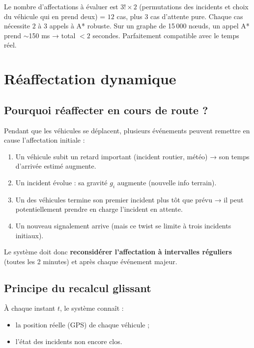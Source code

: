 \documentclass[12pt,a4paper]{article}
\theoremstyle{definition}
\theoremstyle{remark}
\begin{document}
Le nombre d’affectations à évaluer est $3! \times 2$ (permutations des
incidents et choix du véhicule qui en prend deux) = $12$ cas, plus
$3$ cas d’attente pure. Chaque cas nécessite $2$ à $3$ appels à A*
robuste. Sur un graphe de 15\,000 nœuds, un appel A* prend $\sim$150 ms
→ total $< 2$ secondes. Parfaitement compatible avec le temps réel.

\newpage

\section{Réaffectation dynamique}
\label{sec:dyn_realloc}

\subsection{Pourquoi réaffecter en cours de route ?}

Pendant que les véhicules se déplacent, plusieurs événements peuvent
remettre en cause l’affectation initiale :

\begin{enumerate}[leftmargin=1.5em]
  \item Un véhicule subit un retard important (incident routier, météo)
        → son temps d’arrivée estimé augmente.
  \item Un incident évolue : sa gravité $g_i$ augmente (nouvelle info
        terrain).
  \item Un des véhicules termine son premier incident plus tôt que prévu
        → il peut potentiellement prendre en charge l’incident en attente.
  \item Un nouveau signalement arrive (mais ce twist se limite à trois
        incidents initiaux).
\end{enumerate}

Le système doit donc \textbf{reconsidérer l’affectation à intervalles
réguliers} (toutes les 2 minutes) et après chaque événement majeur.

\subsection{Principe du recalcul glissant}

À chaque instant $t$, le système connaît :
\begin{itemize}
  \item la position réelle (GPS) de chaque véhicule ;
  \item l’état des incidents non encore clos.
\end{itemize}
\end{document}
